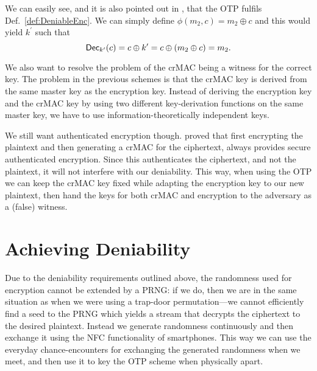 We can easily see, and it is also pointed out in \cite{deniablecrypt}, that the 
\ac{OTP} fulfils Def.~\ref{def:DeniableEnc}.
We can simply define \(\phi( m_2, c ) = m_2\oplus c\) and this would yield 
\(k^\prime\) such that \[
  \operatorname{\mathsf{Dec}}_{k^\prime}( c ) = c\oplus k^\prime = c\oplus ( m_2\oplus c ) = m_2.
\]


We also want to resolve the problem of the \ac{crMAC} being a witness for the 
correct key.
The problem in the previous schemes is that the \ac{crMAC} key is derived from 
the same master key as the encryption key.
Instead of deriving the encryption key and the \ac{crMAC} key by using two 
different key-derivation functions on the same master key, we have to use 
information-theoretically independent keys.

We still want authenticated encryption though.
\citet{authenc} proved that first encrypting the plaintext and then generating 
a \ac{crMAC} for the ciphertext, always provides secure authenticated 
encryption.
Since this authenticates the ciphertext, and not the plaintext, it will not 
interfere with our deniability.
This way, when using the \ac{OTP} we can keep the \ac{crMAC} key fixed while 
adapting the encryption key to our new plaintext, then hand the keys for both 
\ac{crMAC} and encryption to the adversary as a (false) witness.


\section{Achieving Deniability}
\label{sec:otp-kx}


Due to the deniability requirements outlined above, the randomness used for 
encryption cannot be extended by a \ac{PRNG}: if we do, then we are in the same 
situation as when we were using a trap-door permutation---we cannot efficiently 
find a seed to the \ac{PRNG} which yields a stream that decrypts the ciphertext 
to the desired plaintext.
Instead we generate randomness continuously and then exchange it using the 
\ac{NFC} functionality of smartphones.
This way we can use the everyday chance-encounters for exchanging the generated 
randomness when we meet, and then use it to key the \ac{OTP} scheme when 
physically apart.

